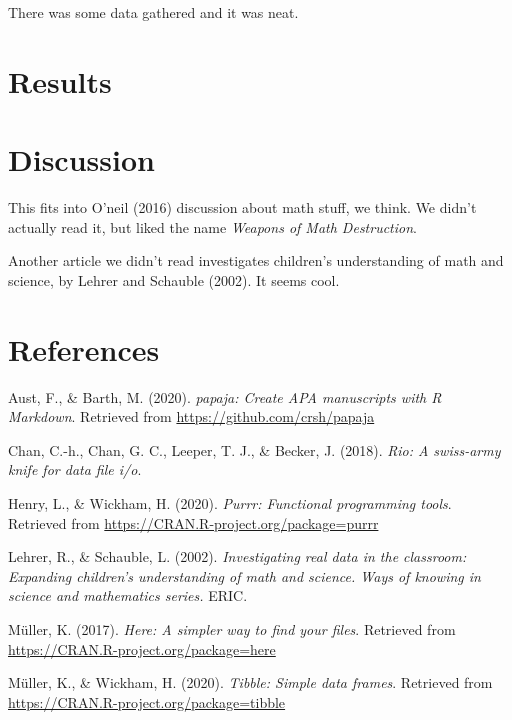 \documentclass[
  english,
  man]{apa6}
\begin{document}
There was some data gathered and it was neat.

\hypertarget{results}{%
\section{Results}\label{results}}

\hypertarget{discussion}{%
\section{Discussion}\label{discussion}}

This fits into O'neil (2016) discussion about math stuff, we think. We didn't actually read it, but liked the name \emph{Weapons of Math Destruction}.

Another article we didn't read investigates children's understanding of math and science, by Lehrer and Schauble (2002). It seems cool.

\newpage

\hypertarget{references}{%
\section{References}\label{references}}

\begingroup
\setlength{\parindent}{-0.5in}
\setlength{\leftskip}{0.5in}

\hypertarget{refs}{}
\leavevmode\hypertarget{ref-R-papaja}{}%
Aust, F., \& Barth, M. (2020). \emph{papaja: Create APA manuscripts with R Markdown}. Retrieved from \url{https://github.com/crsh/papaja}

\leavevmode\hypertarget{ref-R-rio}{}%
Chan, C.-h., Chan, G. C., Leeper, T. J., \& Becker, J. (2018). \emph{Rio: A swiss-army knife for data file i/o}.

\leavevmode\hypertarget{ref-R-purrr}{}%
Henry, L., \& Wickham, H. (2020). \emph{Purrr: Functional programming tools}. Retrieved from \url{https://CRAN.R-project.org/package=purrr}

\leavevmode\hypertarget{ref-lehrer_children}{}%
Lehrer, R., \& Schauble, L. (2002). \emph{Investigating real data in the classroom: Expanding children's understanding of math and science. Ways of knowing in science and mathematics series.} ERIC.

\leavevmode\hypertarget{ref-R-here}{}%
Müller, K. (2017). \emph{Here: A simpler way to find your files}. Retrieved from \url{https://CRAN.R-project.org/package=here}

\leavevmode\hypertarget{ref-R-tibble}{}%
Müller, K., \& Wickham, H. (2020). \emph{Tibble: Simple data frames}. Retrieved from \url{https://CRAN.R-project.org/package=tibble}
\end{document}
